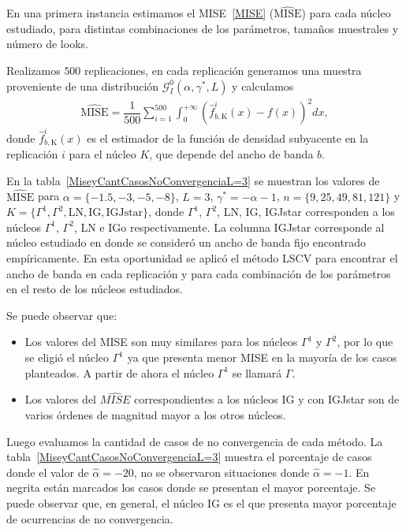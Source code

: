 En una primera instancia estimamos el MISE~\eqref{MISE} ($\widehat{\text{MISE}}$) para cada núcleo estudiado, para distintas combinaciones de los parámetros, tamaños muestrales y número de looks. 

Realizamos $500$ replicaciones, en cada replicación generamos una muestra proveniente de una distribución $\mathcal{G}_I^0(\alpha,\gamma^*,L)$ y calculamos 
\begin{align}
\label{MiseEst}
\widehat{\text{MISE}}=\dfrac{1}{500} \sum_{i=1}^{500}\int_0^{+\infty} (\widehat{f}_{b,\text{K}}^i(x)-f(x))^2 dx,
\end{align}
donde $\widehat{f}_{b,\text{K}}^i(x)$ es el estimador de la función de densidad subyacente en la replicación $i$ para el núcleo $K$, que depende del 
ancho de banda $b$.

En la tabla~\ref{MiseyCantCasosNoConvergenciaL=3} se muestran los valores de $\widehat{\text{MISE}}$ para $\alpha=\{-1.5,-3,-5,-8\}$, $L=3$, $\gamma^*=-\alpha-1$, $n=\{9,25,49,81,121\}$ y $K=\{\Gamma^1,\Gamma^2,\text{LN},\text{IG},\text{IGJstar\}}$, donde $\Gamma^1$, $\Gamma^2$, LN, IG, IGJstar corresponden a los núcleos $\Gamma^1$, $\Gamma^2$, LN e IGo respectivamente. La columna IGJstar corresponde al núcleo estudiado en \citet{gambini2015} donde se consideró un ancho de banda fijo encontrado empíricamente. En esta oportunidad se aplicó el método LSCV para encontrar el ancho de banda en cada replicación y para cada combinación de los parámetros en el resto de los núcleos estudiados.

Se puede observar que:
\begin{itemize}
	\item Los valores del MISE son muy similares para los núcleos $\Gamma^1$ y $\Gamma^2$, por lo que se eligió el núcleo $\Gamma^1$ ya que presenta menor MISE en la mayoría de los casos planteados. A partir de ahora el núcleo $\Gamma^1$ se llamará $\Gamma$.
	\item Los valores del $\widehat{MISE}$ correspondientes a los núcleos IG y con IGJstar son de varios órdenes de magnitud mayor a los otros núcleos.
\end{itemize} 

Luego evaluamos la cantidad de casos de no convergencia de cada método. La tabla~\ref{MiseyCantCasosNoConvergenciaL=3} muestra el porcentaje de casos donde el valor de $\widehat{\alpha}=-20$, no se observaron situaciones donde $\widehat{\alpha}=-1.$ En negrita están marcados los casos donde se presentan el mayor porcentaje. Se puede observar que, en general, el núcleo IG es el que presenta mayor porcentaje de ocurrencias de no convergencia.

